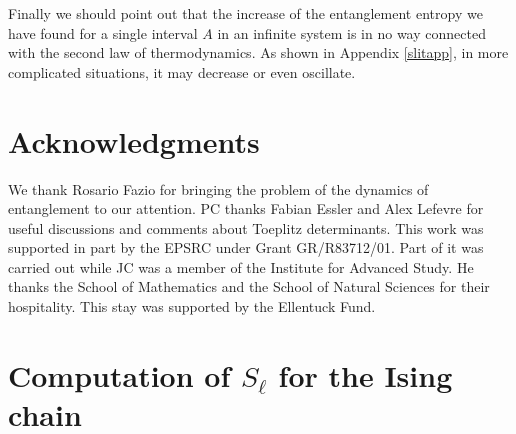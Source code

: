 Finally we should point out that the increase of the entanglement
entropy we have found
for a single interval $A$ in an infinite system is in no way
connected with the second law of thermodynamics. As shown in Appendix
\ref{slitapp}, in more complicated situations, it may decrease or even 
oscillate.











\section*{Acknowledgments}
We thank Rosario Fazio for bringing the problem of the dynamics of 
entanglement to our attention.
PC thanks Fabian Essler and Alex Lefevre for useful discussions and comments 
about Toeplitz determinants.
This work was supported in part by the EPSRC under Grant GR/R83712/01.
Part of it was carried out while JC was a member of the Institute
for Advanced Study.
He thanks the School of Mathematics and the School of Natural Sciences
for their hospitality.
This stay was supported by the Ellentuck Fund.







\appendix

\section{Computation of $S_\ell$ for the Ising chain}
\label{app}




